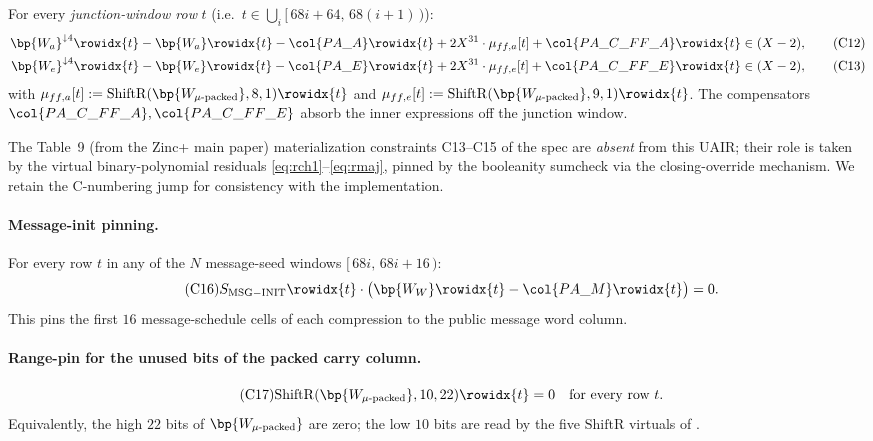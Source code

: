 For every \emph{junction-window row} $t$ (i.e.\
$t \in \bigcup_i [\,68i + 64,\,68(i + 1)\,)$):
\begin{align}
\bp{W_a}^{\downarrow 4}\rowidx{t} - \bp{W_a}\rowidx{t} - \col{PA\_A}\rowidx{t}
   + 2X^{31} \cdot \mu_{ff,a}[t] + \col{PA\_C\_FF\_A}\rowidx{t}
   &\in (X-2), \tag{C12}\label{con:ff-a}\\
\bp{W_e}^{\downarrow 4}\rowidx{t} - \bp{W_e}\rowidx{t} - \col{PA\_E}\rowidx{t}
   + 2X^{31} \cdot \mu_{ff,e}[t] + \col{PA\_C\_FF\_E}\rowidx{t}
   &\in (X-2), \tag{C13}\label{con:ff-e}
\end{align}
with $\mu_{ff,a}[t] := \mathrm{ShiftR}(\bp{W_{\mu\text{-packed}}}, 8, 1)\rowidx{t}$
and $\mu_{ff,e}[t] := \mathrm{ShiftR}(\bp{W_{\mu\text{-packed}}}, 9, 1)\rowidx{t}$.
The compensators $\col{PA\_C\_FF\_A}, \col{PA\_C\_FF\_E}$ absorb
the inner expressions off the junction window.

The Table~9 (from the Zinc+ main paper) materialization constraints C13--C15 of the spec are
\emph{absent} from this UAIR; their role is taken by the virtual
binary-polynomial residuals \eqref{eq:rch1}--\eqref{eq:rmaj},
pinned by the booleanity sumcheck via the closing-override mechanism.
We retain the C-numbering jump for consistency with the implementation.

\paragraph{Message-init pinning.}

For every row $t$ in any of the $N$ message-seed windows
$[\,68i,\,68i+16\,)$:
\begin{equation}\tag{C16}\label{con:msg-init}
S_{\mathrm{MSG-INIT}}\rowidx{t} \cdot \bigl(\bp{W_W}\rowidx{t} - \col{PA\_M}\rowidx{t}\bigr) = 0.
\end{equation}
This pins the first $16$ message-schedule cells of each compression to
the public message word column.

\paragraph{Range-pin for the unused bits of the packed carry column.}
\begin{equation}\tag{C17}\label{con:mu-zero}
\mathrm{ShiftR}(\bp{W_{\mu\text{-packed}}}, 10, 22)\rowidx{t} = 0
\quad \text{for every row } t.
\end{equation}
Equivalently, the high $22$ bits of $\bp{W_{\mu\text{-packed}}}$ are
zero; the low $10$ bits are read by the five $\mathrm{ShiftR}$ virtuals
of \Cref{rem:mu-budget}.

